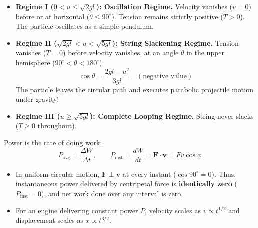 \documentclass[10pt,a4paper]{article}
\begin{document}
\begin{usecasebox}
\begin{itemize}
  \item \textbf{Regime I ($0 < u \le \sqrt{2gl}$): Oscillation Regime.} Velocity vanishes ($v=0$) before or at horizontal ($\theta \le 90^\circ$). Tension remains strictly positive ($T > 0$). The particle oscillates as a simple pendulum.
  \item \textbf{Regime II ($\sqrt{2gl} < u < \sqrt{5gl}$): String Slackening Regime.} Tension vanishes ($T=0$) before velocity vanishes, at an angle $\theta$ in the upper hemisphere ($90^\circ < \theta < 180^\circ$):
  \begin{equation}
    \cos\theta = \frac{2gl - u^2}{3gl} \quad (\text{negative value})
  \end{equation}
  The particle leaves the circular path and executes parabolic projectile motion under gravity!
  \item \textbf{Regime III ($u \ge \sqrt{5gl}$): Complete Looping Regime.} String never slacks ($T \ge 0$ throughout).
\end{itemize}
\end{usecasebox}

\begin{trapbox}
Power is the rate of doing work:
\begin{equation}
  P_{\text{avg}} = \frac{\Delta W}{\Delta t}, \qquad P_{\text{inst}} = \frac{dW}{dt} = \mathbf{F} \cdot \mathbf{v} = F v \cos\phi
\end{equation}
\begin{itemize}
  \item In uniform circular motion, $\mathbf{F} \perp \mathbf{v}$ at every instant ($\cos 90^\circ = 0$). Thus, instantaneous power delivered by centripetal force is \textbf{identically zero} ($P_{\text{inst}} = 0$), and net work done over any interval is zero.
  \item For an engine delivering constant power $P$, velocity scales as $v \propto t^{1/2}$ and displacement scales as $x \propto t^{3/2}$.
\end{itemize}
\end{trapbox}

\end{document}
